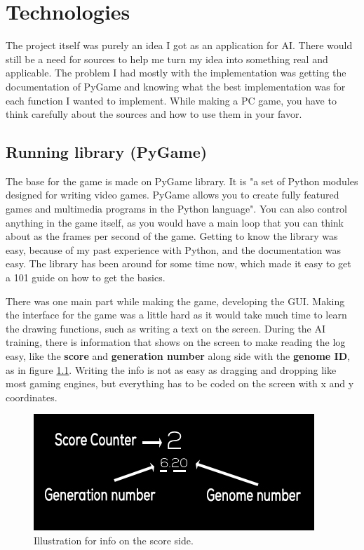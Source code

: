 \chapter{Technologies}

The project itself was purely an idea I got as an application for AI. There would still be a need for sources to help me turn my idea into something real and applicable. The problem I had mostly with the implementation was getting the documentation of PyGame and knowing what the best implementation was for each function I wanted to implement. While making a PC game, you have to think carefully about the sources and how to use them in your favor.

\section{Running library (PyGame)}
The base for the game is made on PyGame\cite{PyGame} library. It is "a set of Python modules designed for writing video games. PyGame allows you to create fully featured games and multimedia programs in the Python language". You can also control anything in the game itself, as you would have a main loop that you can think about as the frames per second of the game. Getting to know the library was easy, because of my past experience with Python, and the documentation was easy. The library has been around for some time now, which made it easy to get a 101 guide on how to get the basics.



There was one main part while making the game, developing the GUI. Making the interface for the game was a little hard as it would take much time to learn the drawing functions, such as writing a text on the screen. During the AI training, there is information that shows on the screen to make reading the log easy, like the \textbf{score} and \textbf{generation number} along side with the \textbf{genome ID}, as in figure \ref{fig:scoreframe}. Writing the info is not as easy as dragging and dropping like most gaming engines, but everything has to be coded on the screen with x and y coordinates.
\begin{figure}[H]
	\centering
	\includegraphics[width=0.7\linewidth]{usedImages/scoreFrame}
	\caption{Illustration for info on the score side.}
	\label{fig:scoreframe}
\end{figure}

